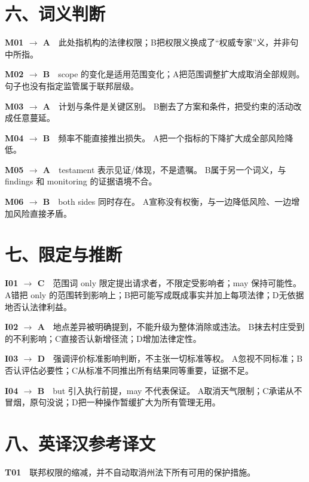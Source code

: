\documentclass[a4paper,11pt,openany]{report}
\begin{document}
\section{六、词义判断}\label{ux516dux8bcdux4e49ux5224ux65ad}

\textbf{M01 \(\rightarrow\) A}　此处指机构的法律权限；B把权限义换成了``权威专家''义，并非句中所指。

\textbf{M02 \(\rightarrow\) B}　scope 的变化是适用范围变化；A把范围调整扩大成取消全部规则。句子也没有指定监管属于联邦层级。

\textbf{M03 \(\rightarrow\) A}　计划与条件是关键区别。 B删去了方案和条件，把受约束的活动改成任意蔓延。

\textbf{M04 \(\rightarrow\) B}　频率不能直接推出损失。 A把一个指标的下降扩大成全部风险降低。

\textbf{M05 \(\rightarrow\) A}　testament 表示见证/体现，不是遗嘱。 B属于另一个词义，与 findings 和 monitoring 的证据语境不合。

\textbf{M06 \(\rightarrow\) B}　both sides 同时存在。 A宣称没有权衡，与一边降低风险、一边增加风险直接矛盾。

\section{七、限定与推断}\label{ux4e03ux9650ux5b9aux4e0eux63a8ux65ad}

\textbf{I01 \(\rightarrow\) C}　范围词 only 限定提出请求者，不限定受影响者；may 保持可能性。 A错把 only 的范围转到影响上；B把可能写成既成事实并加上每项法律；D无依据地否认法律利益。

\textbf{I02 \(\rightarrow\) A}　地点差异被明确提到，不能升级为整体消除或违法。 B抹去村庄受到的不利影响；C直接否认新增径流；D增加法律定性。

\textbf{I03 \(\rightarrow\) D}　强调评价标准影响判断，不主张一切标准等权。 A忽视不同标准；B否认评估必要性；C从标准不同推出所有结果同等重要，证据不足。

\textbf{I04 \(\rightarrow\) B}　but 引入执行前提，may 不代表保证。 A取消天气限制；C承诺从不冒烟，原句没说；D把一种操作暂缓扩大为所有管理无用。

\section{八、英译汉参考译文}\label{ux516bux82f1ux8bd1ux6c49ux53c2ux8003ux8bd1ux6587}

\textbf{T01}　联邦权限的缩减，并不自动取消州法下所有可用的保护措施。
\end{document}
